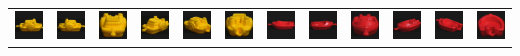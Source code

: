 \documentclass[dutch]{beamer}
\theoremstyle{definition}
\theoremstyle{remark}
\theoremstyle{example}
\begin{document}
{\begin{center}
\begin{tabular}{c@{\ }c@{}c@{}c@{}c@{}c c@{\ }c@{}c@{}c@{}c@{}c}
\includegraphics[width=0.8cm]{coil/beeld-12.eps} &
\includegraphics[width=0.8cm]{coil/beeld-13.eps} &
\includegraphics[width=0.8cm]{coil/beeld-14.eps} &
\includegraphics[width=0.8cm]{coil/beeld-15.eps} &
\includegraphics[width=0.8cm]{coil/beeld-16.eps} &
\includegraphics[width=0.8cm]{coil/beeld-17.eps} &

\includegraphics[width=0.8cm]{coil/beeld-18.eps} &
\includegraphics[width=0.8cm]{coil/beeld-19.eps} &
\includegraphics[width=0.8cm]{coil/beeld-20.eps} &
\includegraphics[width=0.8cm]{coil/beeld-21.eps} &
\includegraphics[width=0.8cm]{coil/beeld-22.eps} &
\includegraphics[width=0.8cm]{coil/beeld-23.eps} \\


\end{tabular}
\end{center}}
\end{document}
